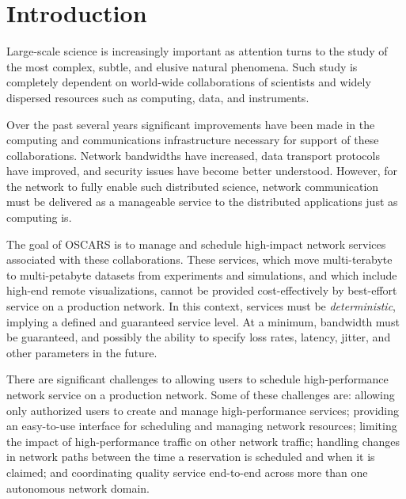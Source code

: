 \documentclass[conference]{IEEEtran}
\begin{document}


\IEEEpeerreviewmaketitle

\section{Introduction}
Large-scale science is increasingly important as attention turns to the
study of the most complex, subtle, and elusive natural phenomena.  Such
study is completely dependent on world-wide collaborations of scientists
and widely dispersed resources such as computing, data, and instruments.

Over the past several years significant improvements have been made in the
computing and communications infrastructure necessary for support of these
collaborations.  Network bandwidths have increased, data transport protocols
have improved, and security issues have become better understood.  However,
for the network to fully enable such distributed science, network
communication must be delivered as a manageable service to the distributed
applications just as computing is.
 
The goal of OSCARS is to manage and schedule high-impact network services
associated with these collaborations.  These services, which move 
multi-terabyte to multi-petabyte datasets from experiments and simulations,
and which include high-end remote visualizations, cannot be provided 
cost-effectively by best-effort service on a production network.  In this context, services must 
be \emph{deterministic}, implying a defined and guaranteed service level.
At a minimum, bandwidth must be guaranteed, and possibly the ability to 
specify loss rates, latency, jitter, and other parameters in the future.

There are significant challenges to allowing users to schedule high-performance 
network service on a production network. Some of these challenges are: allowing 
only authorized users to create and manage high-performance services;
providing an easy-to-use interface for scheduling and managing network 
resources; limiting the impact of high-performance traffic on other network
traffic; handling changes in network paths between the time a reservation is
scheduled and when it is claimed; and coordinating quality service end-to-end 
across more than one autonomous network domain.
\end{document}
